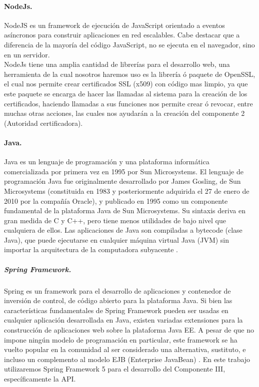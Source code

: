 \documentclass[12pt, a4paper, titlepage]{report}
\begin{document}
			\paragraph{NodeJs.\\}
			NodeJS es un framework de ejecución de JavaScript orientado a eventos asíncronos para construir aplicaciones en red escalables. Cabe destacar que a diferencia de la mayoría del código JavaScript, no se ejecuta en el navegador, sino en un servidor.
			\cite{refNodeJs}\\
			
			NodeJs tiene una amplia cantidad de librerías para el desarrollo web, una herramienta de la cual nosotros haremos uso es la librería ó paquete de OpenSSL, el cual nos permite crear certificados SSL (x509) con código mas limpio, ya que este paquete se encarga de hacer las llamadas al sistema para la creación de los certificados, haciendo llamadas a sus funciones nos permite crear ó revocar, entre muchas otras acciones, las cuales nos ayudarán a la creación del componente 2 (Autoridad certificadora). \cite{refNodeOpenSSL}
			
			\paragraph{Java.\\}
		    Java es un lenguaje de programación y una plataforma informática comercializada por primera vez en 1995 por Sun Microsystems. El lenguaje de programación Java fue originalmente desarrollado por James Gosling, de Sun Microsystems (constituida en 1983 y posteriormente adquirida el 27 de enero de 2010 por la compañía Oracle), y publicado en 1995 como un componente fundamental de la plataforma Java de Sun Microsystems. Su sintaxis deriva en gran medida de C y C++, pero tiene menos utilidades de bajo nivel que cualquiera de ellos. Las aplicaciones de Java son compiladas a bytecode (clase Java), que puede ejecutarse en cualquier máquina virtual Java (JVM) sin importar la arquitectura de la computadora subyacente  \cite{refJava}.
		    
		    \subparagraph{Spring Framework.\\}
		    Spring es un framework para el desarrollo de aplicaciones y contenedor de inversión de control, de código abierto para la plataforma Java. Si bien las características fundamentales de Spring Framework pueden ser usadas en cualquier aplicación desarrollada en Java, existen variadas extensiones para la construcción de aplicaciones web sobre la plataforma Java EE. A pesar de que no impone ningún modelo de programación en particular, este framework se ha vuelto popular en la comunidad al ser considerado una alternativa, sustituto, e incluso un complemento al modelo EJB (Enterprise JavaBean) \cite{refSpring}.
		    En este trabajo utilizaremos Spring Framework 5 para el desarrollo del Componente III, específicamente la API.
		    
\end{document}
